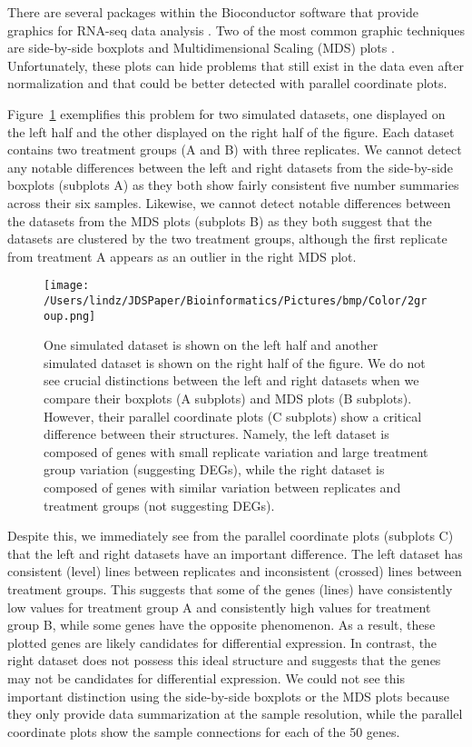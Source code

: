 \documentclass{bioinfo}
\begin{document}
There are several packages within the Bioconductor software that provide graphics for RNA-seq data analysis \citep{Huber}. Two of the most common graphic techniques are side-by-side boxplots and Multidimensional Scaling (MDS) plots \citep{Love, Risso, Robinson, Ritchie}. Unfortunately, these plots can hide problems that still exist in the data even after normalization and that could be better detected with parallel coordinate plots.

Figure~\ref{2group} exemplifies this problem for two simulated datasets, one displayed on the left half and the other displayed on the right half of the figure. Each dataset contains two treatment groups (A and B) with three replicates. We cannot detect any notable differences between the left and right datasets from the side-by-side boxplots (subplots A) as they both show fairly consistent five number summaries across their six samples. Likewise, we cannot detect notable differences between the datasets from the MDS plots (subplots B) as they both suggest that the datasets are clustered by the two treatment groups, although the first replicate from treatment A appears as an outlier in the right MDS plot.

\begin{figure}[!tpb]
\centerline{\texttt{[image: /Users/lindz/JDSPaper/Bioinformatics/Pictures/bmp/Color/2group.png]}}
\caption{One simulated dataset is shown on the left half and another simulated dataset is shown on the right half of the figure. We do not see crucial distinctions between the left and right datasets when we compare their boxplots (A subplots) and MDS plots (B subplots). However, their parallel coordinate plots (C subplots) show a critical difference between their structures. Namely, the left dataset is composed of genes with small replicate variation and large treatment group variation (suggesting DEGs), while the right dataset is composed of genes with similar variation between replicates and treatment groups (not suggesting DEGs). 
\label{2group}}
\end{figure}

Despite this, we immediately see from the parallel coordinate plots (subplots C) that the left and right datasets have an important difference. The left dataset has consistent (level) lines between replicates and inconsistent (crossed) lines between treatment groups. This suggests that some of the genes (lines) have consistently low values for treatment group A and consistently high values for treatment group B, while some genes have the opposite phenomenon. As a result, these plotted genes are likely candidates for differential expression. In contrast, the right dataset does not possess this ideal structure and suggests that the genes may not be candidates for differential expression. We could not see this important distinction using the side-by-side boxplots or the MDS plots because they only provide data summarization at the sample resolution, while the parallel coordinate plots show the sample connections for each of the 50 genes.
\end{document}
